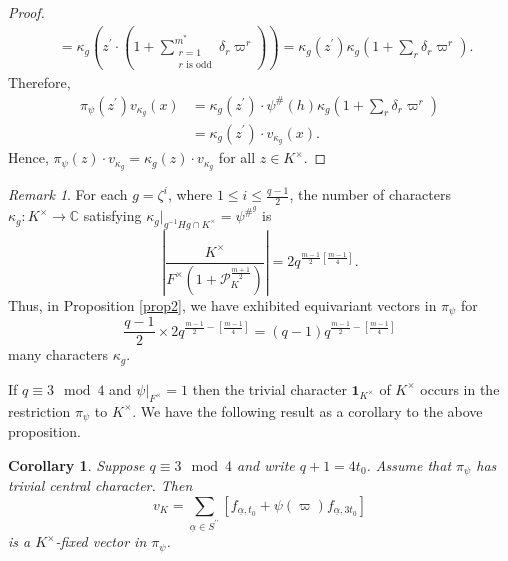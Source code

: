 \documentclass[12pt]{amsart}
\newtheorem{corollary}[theorem]{Corollary}%
\theoremstyle{definition}
\theoremstyle{remark}
\newtheorem{remark}{Remark}
\begin{document}
\begin{proof}
\begin{align*}
&= \kappa_g \left (z^\prime \cdot (1 + \sum\limits_{\substack{r = 1  \\    r \text{ is odd} }}^{m^*} \delta_r \varpi^r) \right) = \kappa_g(z^\prime)  \kappa_g(1 + \sum\limits_{r} \delta_r \varpi^r). 
\end{align*}
Therefore,
\begin{align*}
 \pi_\psi(z^\prime) v_{\kappa_g}(x) &= \kappa_g(z^\prime) \cdot \psi^\#(h) \kappa_g(1 + \sum\limits_{r} \delta_r \varpi^r) \\
 &= \kappa_g(z^\prime) \cdot v_{\kappa_g}(x).
\end{align*}
Hence, $\pi_\psi(z) \cdot v_{\kappa_g}= \kappa_g(z) \cdot v_{\kappa_g}$ for all $z \in K^\times$.
\end{proof}

\begin{remark}\label{rmk2}
For each $g=\zeta^i$, where $1 \leq i \leq \frac{q-1}{2}$, the number of characters $\kappa_g: K^\times \rightarrow \mathbb C$ satisfying $\kappa_g |_{g^{-1}Hg \cap K^\times} = \psi^{{\#}^g}$ is 
\[ \left| \frac{K^\times}{F^\times (1 + \mathcal P_K^{\frac{m+1}{2}})} \right| = 2q^{\frac{m-1}{2} [\frac{m-1}{4}]}.\] 
Thus, in Proposition \ref{prop2}, we have exhibited equivariant vectors in $\pi_\psi$ for 
\[\frac{q-1}{2} \times 2q^{\frac{m-1}{2} - \left[\frac{m-1}{4} \right]} = (q-1)q^{\frac{m-1}{2} - \left[\frac{m-1}{4} \right]}\]
many characters $\kappa_g$.
\end{remark}

If $q \equiv 3 \mod 4$ and $\psi|_{F^\times} = 1$ then the trivial character $\textbf{1}_{K^\times}$ of $K^\times$ occurs in the restriction $\pi_\psi$ to $K^\times$. We have the following result as a corollary to the above proposition. 

\begin{corollary}\label{cor2}
Suppose $q \equiv 3 \mod 4$ and write $q+1 = 4t_0$. Assume that $\pi_\psi$ has trivial central character. Then
\[v_K = \sum\limits_{\underline{\alpha} \in S^{\prime \prime} } \left[ f_{\underline{\alpha}, t_0} + \psi(\varpi) f_{\underline{\alpha}, 3t_0} \right]\]
is a $K^\times$-fixed vector in $\pi_\psi$.
\end{corollary}
\end{document}
